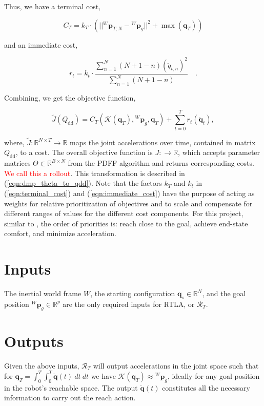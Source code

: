 \documentclass[10pt]{article}
\begin{document}
Thus, we have a terminal cost,

\begin{equation}
\label{eqn:terminal_cost}
	C_T = k_T \cdot \left(||{^W\mathbf{p}_{T, N}} - {^W}\mathbf{p}_{g}||^2 + \max(\mathbf{q}_T)\right)
\end{equation}

and an immediate cost,

\begin{equation}
\label{eqn:immediate_cost}
	r_t  =  k_t \cdot \frac{\sum_{n=1}^N (N+1-n)(\ddot{q}_{t, n})^2}{\sum_{n=1}^N (N+1-n)} \quad .
\end{equation}

Combining, we get the objective function,

\begin{equation}
	\tilde{J}(Q_{\text{dd}}) = C_T\left(\mathcal{K}(\mathbf{q}_T), {^W}\mathbf{p}_{g}, \mathbf{q}_T\right) + \sum_{t=0}^T r_t(\ddot{\mathbf{q}}_t),
\end{equation}

where, $\tilde{J}: \mathbb{R}^{N \times T} \rightarrow \mathbb{R}$ maps the joint accelerations over time, contained in matrix $Q_{\text{dd}}$, to a cost. The overall objective function is $J: \rightarrow \mathbb{R}$, which accepts parameter matrices $\Theta \in \mathbb{R}^{B \times N}$ from the PDFF algorithm and returns corresponding costs. \textcolor{red}{We call this a rollout}. This transformation is described in (\ref{eqn:dmp_theta_to_qdd}). Note that the factors $k_T$ and $k_t$ in (\ref{eqn:terminal_cost}) and (\ref{eqn:immediate_cost}) have the purpose of acting as weights for relative prioritization of objectives and to scale and compensate for different ranges of values for the different cost components. For this project, similar to \cite{pdff}, the order of priorities is: reach close to the goal, achieve end-state comfort, and minimize acceleration.

\section{Inputs}
The inertial world frame $W$, the starting configuration $\mathbf{q}_s \in \mathbb{R}^N$, and the goal position ${^W}\mathbf{p}_{g} \in \mathbb{R}^p$ are the only required inputs for RTLA, or $\mathcal{R}_T$.

\section{Outputs}
Given the above inputs, $\mathcal{R}_T$ will output accelerations in the joint space such that for $\mathbf{q}_T = \int_0^T\int_0^{T}\ddot{\mathbf{q}}(t)\:dt\:dt$ we have $\mathcal{K}(\mathbf{q}_T) \approx {^W}\mathbf{p}_{g}$, ideally for any goal position in the robot's reachable space. The output $\ddot{\mathbf{q}}(t)$ constitutes all the necessary information to carry out the reach action.
\end{document}
